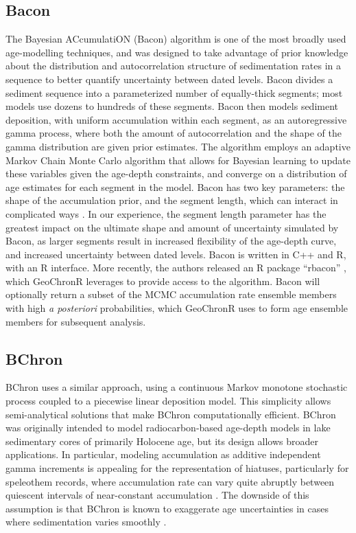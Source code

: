 \documentclass[gchron, manuscript]{copernicus}
\begin{document}
\subsection{Bacon}

The Bayesian ACcumulatiON (Bacon) algorithm \citep{bacon} is one of the most broadly used age-modelling techniques, and was designed to take advantage of prior knowledge about the distribution and autocorrelation structure of sedimentation rates in a sequence to better quantify uncertainty between dated levels.
Bacon divides a sediment sequence into a parameterized number of equally-thick segments; most models use dozens to hundreds of these segments.
Bacon then models sediment deposition, with uniform accumulation within each segment, as an autoregressive gamma process, where both the amount of autocorrelation and the shape of the gamma distribution are given prior estimates.
The algorithm employs an adaptive Markov Chain Monte Carlo algorithm that allows for Bayesian learning to update these variables given the age-depth constraints, and converge on a distribution of age estimates for each segment in the model.
Bacon has two key parameters: the shape of the accumulation prior, and the segment length, which can interact in complicated ways \citep{trachsel2017}.
In our experience, the segment length parameter has the greatest impact on the ultimate shape and amount of uncertainty simulated by Bacon, as larger segments result in increased flexibility of the age-depth curve, and increased uncertainty between dated levels.
Bacon is written in C++ and R, with an R interface.
More recently, the authors released an R package ``rbacon'' \citep{baconPackage}, which GeoChronR leverages to provide access to the algorithm.
Bacon will optionally return a subset of the MCMC accumulation rate ensemble members with high \emph{a posteriori} probabilities, which GeoChronR uses to form age ensemble members for subsequent analysis.

\subsection{BChron}

BChron \citep{bchron, parnell2008flexible} uses a similar approach, using a continuous Markov monotone stochastic process coupled to a piecewise linear deposition model.
This simplicity allows semi-analytical solutions that make BChron computationally efficient. BChron was originally intended to model radiocarbon-based age-depth models in lake sedimentary cores of primarily Holocene age, but its design allows broader applications.
In particular, modeling accumulation as additive independent gamma increments is appealing for the representation of hiatuses, particularly for speleothem records, where accumulation rate can vary quite abruptly between quiescent intervals of near-constant accumulation \citep{Parnell_QSR2011, PRYSM, Hu_epsl17}.
The downside of this assumption is that BChron is known to exaggerate age uncertainties in cases where sedimentation varies smoothly \citep{trachsel2017}.
\end{document}
